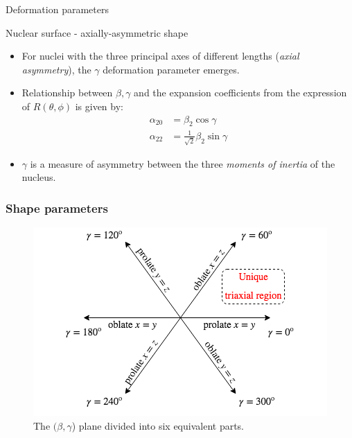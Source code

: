 \documentclass{beamer}
\begin{document}
\begin{frame}{Deformation parameters}
    \begin{block}{Nuclear surface - axially-asymmetric shape}
    \begin{itemize}
    \item For nuclei with the three principal axes of different lengths (\emph{axial asymmetry}), the $\gamma$ deformation parameter emerges.
    \item Relationship between $\beta,\gamma$ and the expansion coefficients from the expression of $R(\theta,\phi)$ is given by:
    \begin{align}
        \alpha_{20}&=\beta_2\cos\gamma\\
        \alpha_{22}&=\frac{1}{\sqrt{2}}\beta_2\sin\gamma
    \end{align}
    \item $\gamma$ is a measure of asymmetry between the three \textit{moments of inertia} of the nucleus.
    \end{itemize}
    \end{block}
\end{frame}

\begin{frame}
\frametitle{Shape parameters}
\begin{figure}
    \centering
    \includegraphics[scale=0.5]{figs/NuclearShapes1.png}
    \caption{The $(\beta,\gamma$) plane divided into six equivalent parts.}
    \label{fig:betagamma}
\end{figure}
\end{frame}
\end{document}
